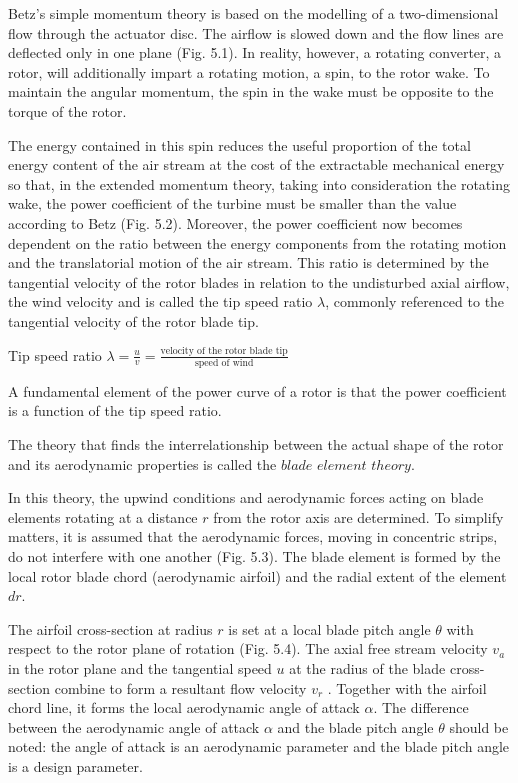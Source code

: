 Betz’s simple momentum theory is based on the modelling of a two-dimensional flow through the actuator disc. The airflow is slowed down and the flow lines are deflected only in one plane (Fig. 5.1). In reality, however, a rotating converter, a rotor, will additionally impart a rotating motion, a spin, to the rotor wake. To maintain the angular momentum, the spin in the wake must be opposite to the torque of the rotor.

The energy contained in this spin reduces the useful proportion of the total energy content of the air stream at the cost of the extractable mechanical energy so that, in the extended momentum theory, taking into consideration the rotating wake, the power coefficient of the turbine must be smaller than the value according to Betz (Fig. 5.2). Moreover, the power coefficient now becomes dependent on the ratio between the energy components from the rotating motion and the translatorial motion of the air stream. This ratio is determined by the tangential velocity of the rotor blades in relation to the undisturbed axial airflow, the wind velocity and is called the tip speed ratio $\lambda$, commonly referenced to the tangential velocity of the rotor blade tip.


Tip speed ratio $\lambda = \frac{u}{v} = \frac{\text{velocity of the rotor blade tip}}{\text{speed of wind}}$

A fundamental element of the power curve of a rotor is that the power coefficient is a function of the tip speed ratio.

The theory that finds the interrelationship between the actual shape of the rotor and its aerodynamic properties is called the $blade$ $element$ $theory$.

In this theory, the upwind conditions and aerodynamic forces acting on blade elements rotating at a distance $r$ from the rotor axis are determined. To simplify matters, it is assumed that the aerodynamic forces, moving in concentric strips, do not interfere with one another (Fig. 5.3). The blade element is formed by the local rotor blade chord (aerodynamic airfoil) and the radial extent of the element $dr$.

The airfoil cross-section at radius $r$ is set at a local blade pitch angle $\theta$ with respect to the rotor plane of rotation (Fig. 5.4). The axial free stream velocity $v_a$ in the rotor plane and the tangential speed $u$ at the radius of the blade cross-section combine to form a resultant flow velocity $v_r$ . Together with the airfoil chord line, it forms the local aerodynamic angle of attack $\alpha$. The difference between the aerodynamic angle of attack $\alpha$ and the blade pitch angle $\theta$ should be noted: the angle of attack is an aerodynamic parameter and the blade pitch angle is a design parameter.

